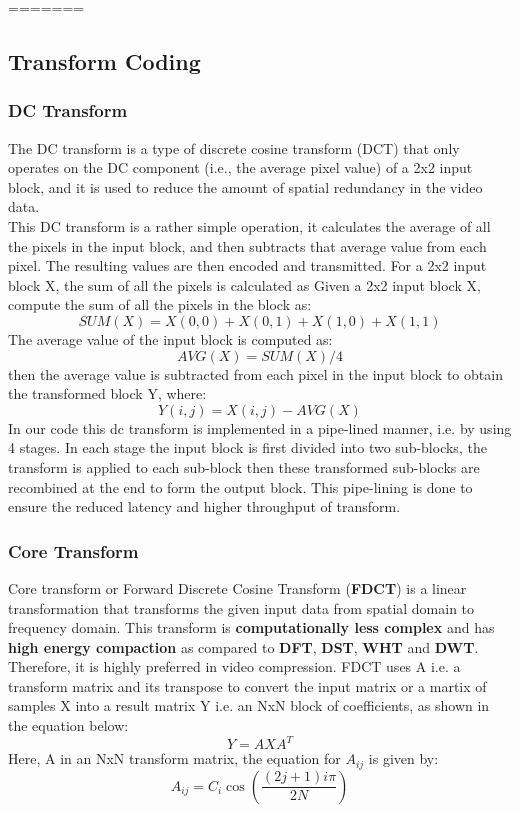  
=======
\subsection{Transform Coding}

\subsubsection{DC Transform}
The DC transform is a type of discrete cosine transform (DCT) that only operates on the DC component (i.e., the average pixel value) of a 2x2 input block, and it is used to reduce the amount of spatial redundancy in the video data.\\
This DC transform is a rather simple operation, it calculates the average of all the pixels in the input block, and then subtracts that average value from each pixel. The resulting values are then encoded and transmitted. For a 2x2 input block X, the sum of all the pixels is calculated as Given a 2x2 input block X, compute the sum of all the pixels in the block as: \begin{equation}
	SUM(X) = X(0,0) + X(0,1) + X(1,0) + X(1,1)
\end{equation}
The average value of the input block is computed as:
\begin{equation}
 AVG(X) = SUM(X) / 4
\end{equation}
then the average value is subtracted from each pixel in the input block to obtain the transformed block Y, where:
\begin{equation}
 	Y(i,j) = X(i,j) - AVG(X) 
\end{equation} 	
In our code this dc transform is implemented in a pipe-lined manner, i.e. by using 4 stages. In each stage the input block is first divided into two sub-blocks, the transform is applied to each sub-block then these transformed sub-blocks are recombined at the end to form the output block. This pipe-lining is done to ensure the reduced latency and higher throughput of transform. 

\subsubsection{Core Transform}
Core transform or Forward Discrete Cosine Transform (\textbf{FDCT}) is a linear transformation that transforms the given input data from spatial domain to frequency domain. This transform is \textbf{computationally less complex} and has \textbf{high energy compaction} as compared to \textbf{DFT}, \textbf{DST}, \textbf{WHT} and \textbf{DWT}. Therefore, it is highly preferred in video compression.
FDCT uses A i.e. a transform matrix and its transpose to convert the input matrix or a martix of samples X into a result matrix Y i.e. an NxN block of coefficients, as shown in the equation below:
\begin{equation}
	Y = AXA^{T}
\end{equation}
Here, A in an NxN transform matrix, the equation for $A_{ij}$ is given by:
\[
A_{ij} = C_i \cos\left(\frac{(2j + 1)i\pi}{2N}\right)
\]

